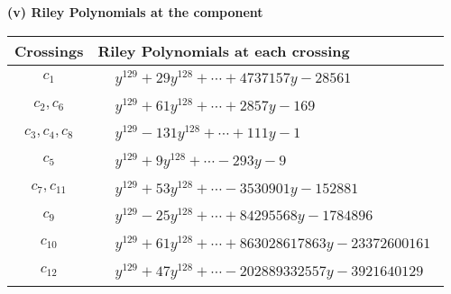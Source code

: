\documentclass[1p]{elsarticle_modified}
\theoremstyle{definition}
\begin{document}
\newpage\renewcommand{\arraystretch}{1}
\flushleft \textbf{(v) Riley Polynomials at the component}\newline \\
\begin{tabular}{m{50pt}|m{274pt}}
Crossings & \hspace{64pt}Riley Polynomials at each crossing \\
\hline $$\begin{aligned}c_{1}\end{aligned}$$&$\begin{aligned}
&y^{129}+29 y^{128}+\cdots+4737157 y-28561
\end{aligned}$\\
\hline $$\begin{aligned}c_{2},c_{6}\end{aligned}$$&$\begin{aligned}
&y^{129}+61 y^{128}+\cdots+2857 y-169
\end{aligned}$\\
\hline $$\begin{aligned}c_{3},c_{4},c_{8}\end{aligned}$$&$\begin{aligned}
&y^{129}-131 y^{128}+\cdots+111 y-1
\end{aligned}$\\
\hline $$\begin{aligned}c_{5}\end{aligned}$$&$\begin{aligned}
&y^{129}+9 y^{128}+\cdots-293 y-9
\end{aligned}$\\
\hline $$\begin{aligned}c_{7},c_{11}\end{aligned}$$&$\begin{aligned}
&y^{129}+53 y^{128}+\cdots-3530901 y-152881
\end{aligned}$\\
\hline $$\begin{aligned}c_{9}\end{aligned}$$&$\begin{aligned}
&y^{129}-25 y^{128}+\cdots+84295568 y-1784896
\end{aligned}$\\
\hline $$\begin{aligned}c_{10}\end{aligned}$$&$\begin{aligned}
&y^{129}+61 y^{128}+\cdots+863028617863 y-23372600161
\end{aligned}$\\
\hline $$\begin{aligned}c_{12}\end{aligned}$$&$\begin{aligned}
&y^{129}+47 y^{128}+\cdots-202889332557 y-3921640129
\end{aligned}$\\
\hline
\end{tabular}\\~\\
\end{document}
